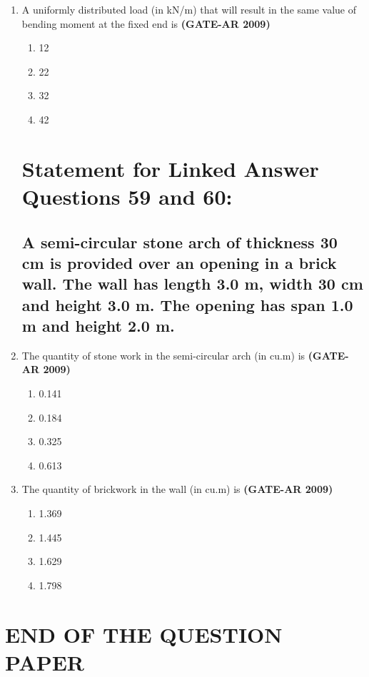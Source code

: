\documentclass[a4paper,10pt]{article}
\begin{document}
\begin{enumerate}
    \item A uniformly distributed load (in kN/m) that will result in the same value of bending moment at the fixed end is \hfill \textbf{(GATE-AR 2009)}
    \begin{multicols}{4}
	\begin{enumerate}
        \item 12
        \item 22
        \item 32
        \item 42
    \end{enumerate}
	\end{multicols}

\section*{Statement for Linked Answer Questions 59 and 60:}
\subsection*{A semi-circular stone arch of thickness 30 cm is provided over an opening in a brick wall. The wall has length 3.0 m, width 30 cm and height 3.0 m. The opening has span 1.0 m and height 2.0 m.}

    \item The quantity of stone work in the semi-circular arch (in cu.m) is \hfill \textbf{(GATE-AR 2009)}
    \begin{multicols}{4}
	\begin{enumerate}
        \item 0.141
        \item 0.184
        \item 0.325
        \item 0.613
    \end{enumerate}
	\end{multicols}

    \item The quantity of brickwork in the wall (in cu.m) is \hfill \textbf{(GATE-AR 2009)}
    \begin{multicols}{4}
	\begin{enumerate}
        \item 1.369
        \item 1.445
        \item 1.629
        \item 1.798
    \end{enumerate}
	\end{multicols}
    
\end{enumerate}

\centering
\section*{END OF THE QUESTION PAPER}
\end{document}

